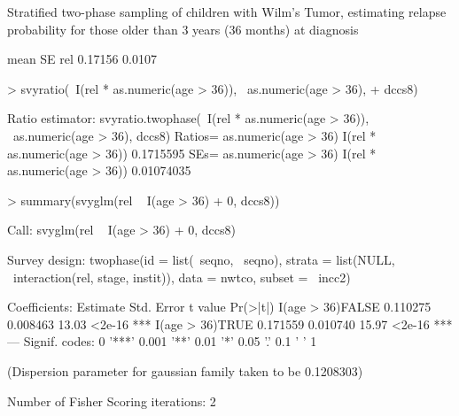 \documentclass{article}
\begin{document}
Stratified two-phase sampling of children with Wilm's Tumor,
estimating relapse probability for those older than 3 years (36
months) at diagnosis
\begin{Schunk}
\begin{Soutput}
       mean     SE
rel 0.17156 0.0107
\end{Soutput}
\begin{Sinput}
> svyratio(~I(rel * as.numeric(age > 36)), ~as.numeric(age > 36), 
+     dccs8)
\end{Sinput}
\begin{Soutput}
Ratio estimator: svyratio.twophase(~I(rel * as.numeric(age > 36)), ~as.numeric(age > 
    36), dccs8)
Ratios=
                              as.numeric(age > 36)
I(rel * as.numeric(age > 36))            0.1715595
SEs=
                              as.numeric(age > 36)
I(rel * as.numeric(age > 36))           0.01074035
\end{Soutput}
\begin{Sinput}
> summary(svyglm(rel ~ I(age > 36) + 0, dccs8))
\end{Sinput}
\begin{Soutput}
Call:
svyglm(rel ~ I(age > 36) + 0, dccs8)

Survey design:
twophase(id = list(~seqno, ~seqno), strata = list(NULL, ~interaction(rel, 
    stage, instit)), data = nwtco, subset = ~incc2)

Coefficients:
                 Estimate Std. Error t value Pr(>|t|)    
I(age > 36)FALSE 0.110275   0.008463   13.03   <2e-16 ***
I(age > 36)TRUE  0.171559   0.010740   15.97   <2e-16 ***
---
Signif. codes:  0 '***' 0.001 '**' 0.01 '*' 0.05 '.' 0.1 ' ' 1 

(Dispersion parameter for gaussian family taken to be 0.1208303)

Number of Fisher Scoring iterations: 2
\end{Soutput}
\end{Schunk}
\end{document}
